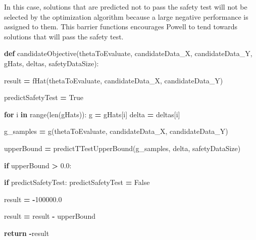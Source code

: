 \documentclass[12pt, twoside]{amherstthesis}
\newenvironment{Shaded}{\begin{snugshade}}{\end{snugshade}}
\newcommand{\BuiltInTok}[1]{#1}
\newcommand{\ControlFlowTok}[1]{\textcolor[rgb]{0.13,0.29,0.53}{\textbf{#1}}}
\newcommand{\FloatTok}[1]{\textcolor[rgb]{0.00,0.00,0.81}{#1}}
\newcommand{\KeywordTok}[1]{\textcolor[rgb]{0.13,0.29,0.53}{\textbf{#1}}}
\newcommand{\NormalTok}[1]{#1}
\newcommand{\OperatorTok}[1]{\textcolor[rgb]{0.81,0.36,0.00}{\textbf{#1}}}
\newcommand{\VariableTok}[1]{\textcolor[rgb]{0.00,0.00,0.00}{#1}}
\begin{document}
\noindent In this case, solutions that are predicted not to pass the safety test will not be selected by the optimization algorithm because a large negative performance is assigned to them. This barrier functions encourages Powell to tend towards solutions that will pass the safety test.
\begin{Shaded}
\begin{Highlighting}[]
\KeywordTok{def}\NormalTok{ candidateObjective(thetaToEvaluate, candidateData\_X, candidateData\_Y, }
\NormalTok{gHats, deltas, safetyDataSize): }

\NormalTok{    result }\OperatorTok{=}\NormalTok{ fHat(thetaToEvaluate, candidateData\_X, candidateData\_Y)}

\NormalTok{    predictSafetyTest }\OperatorTok{=} \VariableTok{True}     
    
    \ControlFlowTok{for}\NormalTok{ i }\KeywordTok{in} \BuiltInTok{range}\NormalTok{(}\BuiltInTok{len}\NormalTok{(gHats)):  }
\NormalTok{        g         }\OperatorTok{=}\NormalTok{ gHats[i]       }
\NormalTok{        delta     }\OperatorTok{=}\NormalTok{ deltas[i]      }

\NormalTok{        g\_samples }\OperatorTok{=}\NormalTok{ g(thetaToEvaluate, candidateData\_X, }
\NormalTok{        candidateData\_Y)}

\NormalTok{        upperBound }\OperatorTok{=}\NormalTok{ predictTTestUpperBound(g\_samples, delta, }
\NormalTok{        safetyDataSize)}

        \ControlFlowTok{if}\NormalTok{ upperBound }\OperatorTok{\textgreater{}} \FloatTok{0.0}\NormalTok{:}

            \ControlFlowTok{if}\NormalTok{ predictSafetyTest:}
\NormalTok{                predictSafetyTest }\OperatorTok{=} \VariableTok{False}  

\NormalTok{                result }\OperatorTok{=} \OperatorTok{{-}}\FloatTok{100000.0}    

\NormalTok{            result }\OperatorTok{=}\NormalTok{ result }\OperatorTok{{-}}\NormalTok{ upperBound}

    \ControlFlowTok{return} \OperatorTok{{-}}\NormalTok{result  }
\end{Highlighting}
\end{Shaded}
\end{document}

